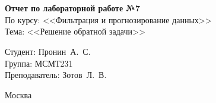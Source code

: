 \begin{titlepage}
	\centering
	
	\vspace{-2.2mm}
	\vhrulefill{0.9mm}\\
	\vspace{-7mm}
	\vhrulefill{0.2mm}\\
	\vspace{2mm}
	
	\vspace{50mm}
	
	\vspace{30mm}
	
	\textbf{Отчет по лабораторной работе №7}\\
	По курсу: <<Фильтрация и прогнозирование данных>>\\
	Тема: <<Решение обратной задачи>>\\
	
	\vspace{60mm}
	
	\hspace{70mm} Студент:       \hfill Пронин~А.~С.\\
	\hspace{70mm} Группа:        \hfill МСМТ231\\
	\hspace{70mm} Преподаватель: \hfill Зотов~Л.~В.\\
	
	\vfill
	
	Москва\\
	\the\year
\end{titlepage}

\setcounter{page}{2}